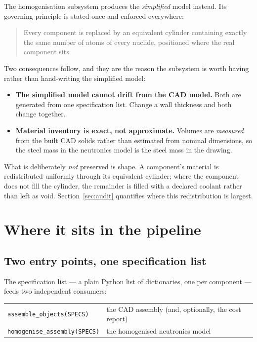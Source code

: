 \documentclass[9pt,a4paper]{extarticle}
\newcommand{\code}[1]{\texttt{\small #1}}
\begin{document}
The homogenisation subsystem produces the \emph{simplified} model instead. Its
governing principle is stated once and enforced everywhere:

\begin{quote}
Every component is replaced by an equivalent cylinder containing exactly the
same number of atoms of every nuclide, positioned where the real component sits.
\end{quote}

Two consequences follow, and they are the reason the subsystem is worth having
rather than hand-writing the simplified model:

\begin{itemize}
  \item \textbf{The simplified model cannot drift from the CAD model.} Both are
    generated from one specification list. Change a wall thickness and both
    change together.
  \item \textbf{Material inventory is exact, not approximate.} Volumes are
    \emph{measured} from the built CAD solids rather than estimated from
    nominal dimensions, so the steel mass in the neutronics model is the steel
    mass in the drawing.
\end{itemize}

What is deliberately \emph{not} preserved is shape. A component's material is
redistributed uniformly through its equivalent cylinder; where the component
does not fill the cylinder, the remainder is filled with a declared coolant
rather than left as void. Section~\ref{sec:audit} quantifies where this
redistribution is largest.

\section{Where it sits in the pipeline}

\subsection{Two entry points, one specification list}

The specification list --- a plain Python list of dictionaries, one per
component --- feeds two independent consumers:

\begin{center}
\begin{tabular}{@{}ll@{}}
\toprule
\code{assemble\_objects(SPECS)} & the CAD assembly (and, optionally, the cost report) \\
\code{homogenise\_assembly(SPECS)} & the homogenised neutronics model \\
\bottomrule
\end{tabular}
\end{center}
\end{document}
